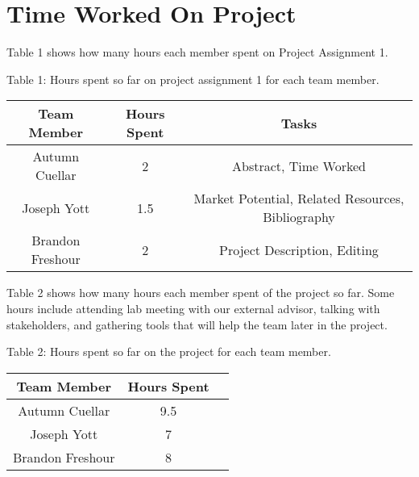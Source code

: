 \section{Time Worked On Project}
\label{sect:time_worked_on_project}

Table 1 shows how many hours each member spent on Project Assignment 1. 

\begin{center}
Table 1: Hours spent so far on project assignment 1 for each team member.

    \begin{tabular}{|c|c|c|}
    \hline
        Team Member & Hours Spent & Tasks \\
    \hline\hline
         Autumn Cuellar & 2 & Abstract, Time Worked \\
    \hline
         Joseph Yott & 1.5 & Market Potential, Related Resources, Bibliography \\
    \hline
         Brandon Freshour & 2 & Project Description, Editing  \\
    \hline
    \end{tabular}

\end{center}
\bigskip
\par
 Table 2 shows how many hours each member spent of the project so far. Some hours include attending lab meeting with our external advisor, talking with stakeholders, and gathering tools that will help the team later in the project.

\begin{center}
Table 2: Hours spent so far on the project for each team member.

    \begin{tabular}{|c|c|c|}
    \hline
        Team Member & Hours Spent \\
    \hline\hline
         Autumn Cuellar & 9.5 \\
    \hline
         Joseph Yott & 7 \\
    \hline
         Brandon Freshour & 8  \\
    \hline
    \end{tabular}

\end{center}


